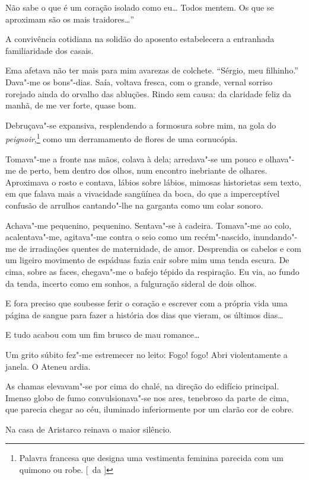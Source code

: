 Não sabe o que é um coração isolado como eu\ldots{}
Todos mentem. Os que se aproximam são os mais traidores\ldots{}'' 

A convivência cotidiana na solidão do aposento estabelecera a entranhada
familiaridade dos casais. 

Ema afetava não ter mais para mim avarezas de
colchete. ``Sérgio, meu filhinho.'' Dava"-me os bons"-dias. Saía, voltava
fresca, com o grande, vernal sorriso rorejado ainda do orvalho das
abluções. Rindo sem causa: da claridade feliz da manhã, de me ver
forte, quase bom. 

Debruçava"-se expansiva, resplendendo a formosura
sobre mim, na gola do \textit{peignoir},\footnote{ Palavra francesa que 
designa uma vestimenta feminina parecida com um quimono ou robe. [~da ]} 
como um derramamento de flores de uma cornucópia. 

Tomava"-me a fronte nas mãos, colava à dela; arredava"-se
um pouco e olhava"-me de perto, bem dentro dos olhos, num encontro
inebriante de olhares. Aproximava o rosto e contava, lábios sobre
lábios, mimosas historietas sem texto, em que falava mais a vivacidade
sangüínea da boca, do que a imperceptível confusão de arrulhos
cantando"-lhe na garganta como um colar sonoro. 

Achava"-me pequenino,
pequenino. Sentava"-se à cadeira. Tomava"-me ao colo,
acalentava"-me, agitava"-me contra o seio como um recém"-nascido,
inundando"-me de irradiações quentes de maternidade, de amor.
Desprendia os cabelos e com um ligeiro movimento de espáduas fazia cair
sobre mim uma tenda escura. De cima, sobre as faces, chegava"-me o
bafejo tépido da respiração. Eu via, ao fundo da tenda, incerto como em
sonhos, a fulguração sideral de dois olhos. 

E fora preciso que soubesse
ferir o coração e escrever com a própria vida uma página de sangue para
fazer a história dos dias que vieram, os últimos dias\ldots{} 

E tudo acabou com um fim brusco de mau romance\ldots{} 

Um grito súbito 
fez"-me estremecer no leito: Fogo! fogo! Abri violentamente a janela. 
O Ateneu ardia. 

As chamas elevavam"-se por cima do 
chalé, na direção do edifício
principal. Imenso globo de fumo convulsionava"-se nos ares, tenebroso
da parte de cima, que parecia chegar ao céu, iluminado inferiormente
por um clarão cor de cobre. 

Na casa de Aristarco reinava o maior silêncio. 

